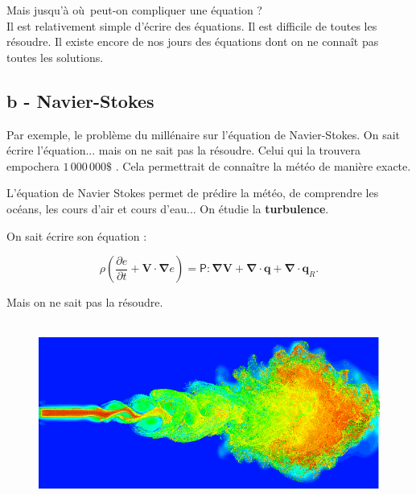 \documentclass[11pt]{article}
\begin{document}
Mais jusqu’à où peut-on compliquer une équation ? \\

Il est relativement simple d'écrire des équations. Il est difficile de toutes les résoudre. Il existe encore de nos jours des équations dont on ne connaît pas toutes les solutions. 

\newpage

\subsection*{b - Navier-Stokes}
Par exemple, le problème du millénaire sur l’équation de Navier-Stokes. On sait écrire l'équation... mais on ne sait pas la résoudre. Celui qui la trouvera empochera  $1 \, 000 \, 000 \$$ . Cela permettrait de connaître la météo de manière exacte. 


L'équation de Navier Stokes permet de prédire la météo, de comprendre les océans, les cours d'air et cours d'eau... On étudie la \textbf{turbulence}.

On sait écrire son équation : 

$$\rho \left({\dfrac {\partial e}{\partial t}}+\mathbf {V} \cdot \mathbf {\nabla } e\right)={\mathsf {P}}:\mathbf {\nabla } \mathbf {V} +\mathbf {\nabla } \cdot \mathbf {q} +\mathbf {\nabla } \cdot \mathbf {q} _{R}.$$

Mais on ne sait pas la résoudre.

  \begin{figure}[H]
        \centering
        \includegraphics[width=0.6\linewidth]{3x11-equations/ns-1.png}
  \end{figure}
\end{document}
